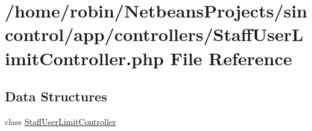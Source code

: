 \hypertarget{_staff_user_limit_controller_8php}{}\section{/home/robin/\+Netbeans\+Projects/sincontrol/app/controllers/\+Staff\+User\+Limit\+Controller.php File Reference}
\label{_staff_user_limit_controller_8php}
\subsection*{Data Structures}
\begin{DoxyCompactItemize}
\item 
class \hyperlink{class_staff_user_limit_controller}{Staff\+User\+Limit\+Controller}
\end{DoxyCompactItemize}
